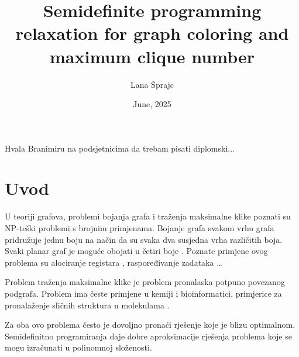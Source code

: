 \documentclass[diplomskirad]{fer}
\title{Semidefinite programming relaxation for graph coloring and maximum clique number}
\author{Lana Šprajc}
\date{June, 2025}
\begin{document}
\maketitle






\begin{zahvale}
  Hvala Branimiru na podsjetnicima da trebam pisati diplomski...
\end{zahvale}


\mainmatter


\tableofcontents


\chapter{Uvod}
\label{pog:uvod}

U teoriji grafova, problemi bojanja grafa i traženja maksimalne klike poznati su NP-teški problemi s brojnim primjenama. Bojanje grafa svakom vrhu 
grafa pridružuje jednu boju na način da su svaka dva susjedna vrha različitih boja. Svaki planar graf je moguće obojati u četiri boje \cite{fritsch1998four}.
Poznate primjene ovog problema su alociranje registara \cite{inproceedings}, raspoređivanje zadataka \cite{10.1093/comjnl/12.4.317}\dots

Problem traženja maksimalne klike je problem pronalaska potpuno povezanog podgrafa. Problem ima česte primjene u kemiji i bioinformatici,
primjerice za pronalaženje sličnih struktura u molekulama \cite{NAP4886}.

Za oba ovo problema često je dovoljno pronaći rješenje koje je blizu optimalnom. Semidefinitno programiranja daje dobre aproksimacije rješenja problema
koje se mogu izračunati u polinomnoj složenosti.
\end{document}
